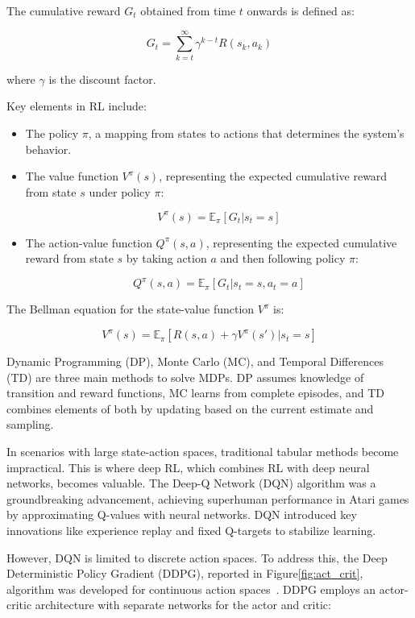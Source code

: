 The cumulative reward \( G_t \) obtained from time \( t \) onwards is defined as:

\[ G_t = \sum_{k=t}^{\infty} \gamma^{k-t} R(s_k, a_k) \]

where \( \gamma \) is the discount factor.

Key elements in RL include:
\begin{itemize}
	\item The policy \( \pi \), a mapping from states to actions that determines the system's behavior.
	\item The value function \( V^{\pi}(s) \), representing the expected cumulative reward from state \( s \) under policy \( \pi \):
	
	\[ V^{\pi}(s) = \mathbb{E}_{\pi} [G_t | s_t = s] \]
	
	\item The action-value function \( Q^{\pi}(s,a) \), representing the expected cumulative reward from state \( s \) by taking action \( a \) and then following policy \( \pi \):
	
	\[ Q^{\pi}(s,a) = \mathbb{E}_{\pi} [G_t | s_t = s, a_t = a] \]
\end{itemize}

The Bellman equation for the state-value function \( V^{\pi} \) is:

\[ V^{\pi}(s) = \mathbb{E}_{\pi} [R(s,a) + \gamma V^{\pi}(s') | s_t = s] \]

Dynamic Programming (DP), Monte Carlo (MC), and Temporal Differences (TD) are three main methods to solve MDPs. DP assumes knowledge of transition and reward functions, MC learns from complete episodes, and TD combines elements of both by updating based on the current estimate and sampling.

In scenarios with large state-action spaces, traditional tabular methods become impractical. This is where deep RL, which combines RL with deep neural networks, becomes valuable. The Deep-Q Network (DQN) algorithm was a groundbreaking advancement, achieving superhuman performance in Atari games by approximating Q-values with neural networks. DQN introduced key innovations like experience replay and fixed Q-targets to stabilize learning.

However, DQN is limited to discrete action spaces. To address this, the Deep Deterministic Policy Gradient (DDPG), reported in Figure\tildeAdd\ref{fig:act_crit}, algorithm was developed for continuous action spaces~\cite{sutton2018reinforcement}. DDPG employs an actor-critic architecture with separate networks for the actor and critic:

